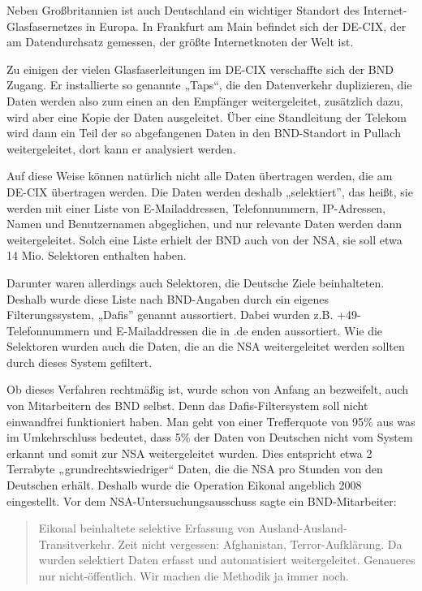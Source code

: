 \documentclass[12pt,a4paper]{scrartcl}
\begin{document}
Neben Großbritannien ist auch Deutschland ein wichtiger Standort des Internet-Glasfasernetzes in Europa. In Frankfurt am Main befindet sich der DE-CIX, der am Datendurchsatz gemessen, der größte Internetknoten der Welt ist.\cite{decix_facts}

Zu einigen der vielen Glasfaserleitungen im DE-CIX verschaffte sich der BND Zugang. Er installierte so genannte „Taps“, die den Datenverkehr duplizieren, die Daten werden also zum einen an den Empfänger weitergeleitet, zusätzlich dazu, wird aber eine Kopie der Daten ausgeleitet.\cite{wiki_eikonal} Über eine Standleitung der Telekom wird dann ein Teil der so abgefangenen Daten in den BND-Standort in Pullach weitergeleitet, dort kann er analysiert werden.\cite{zeit_eikonal}

Auf diese Weise können natürlich nicht alle Daten übertragen werden, die am DE-CIX übertragen werden. Die Daten werden deshalb „selektiert”, das heißt, sie werden mit einer Liste von E-Mailaddressen, Telefonnummern, IP-Adressen, Namen und Benutzernamen abgeglichen, und nur relevante Daten werden dann weitergeleitet. Solch eine Liste erhielt der BND auch von der NSA, sie soll etwa 14 Mio. Selektoren enthalten haben.\cite{ard_selektoren}

Darunter waren allerdings auch Selektoren, die Deutsche Ziele beinhalteten. Deshalb wurde diese Liste nach BND-Angaben durch ein eigenes Filterungssystem, „Dafis” genannt aussortiert. Dabei wurden z.B. +49-Telefonnummern und E-Mailaddressen die in .de enden aussortiert. Wie die Selektoren wurden auch die Daten, die an die NSA weitergeleitet werden sollten durch dieses System gefiltert.\cite{bundestag_selektoren}

Ob dieses Verfahren rechtmäßig ist, wurde schon von Anfang an bezweifelt, auch von Mitarbeitern des BND selbst. Denn das Dafis-Filtersystem soll nicht einwandfrei funktioniert haben. Man geht von einer Trefferquote von 95\% aus was im Umkehrschluss bedeutet, dass 5\% der Daten von Deutschen nicht vom System erkannt und somit zur NSA weitergeleitet wurden. Dies entspricht etwa 2 Terrabyte „grundrechtswiedriger“ Daten, die die NSA pro Stunden von den Deutschen erhält.\cite{wiki_eikonal} Deshalb wurde die Operation Eikonal angeblich 2008 eingestellt. Vor dem NSA-Untersuchungsausschuss sagte ein BND-Mitarbeiter:

\begin{quote}
Eikonal beinhaltete selektive Erfassung von Ausland-Ausland-Transitverkehr. Zeit nicht vergessen: Afghanistan, Terror-Aufklärung. Da wurden selektiert Daten erfasst und automatisiert weitergeleitet. Genaueres nur nicht-öffentlich. Wir machen die Methodik ja immer noch.\cite{wiki_eikonal}
\end{quote}
\end{document}

